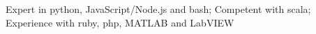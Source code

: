 \item Expert in python, JavaScript/Node.js and bash; Competent with scala; Experience with ruby, php, MATLAB and LabVIEW
